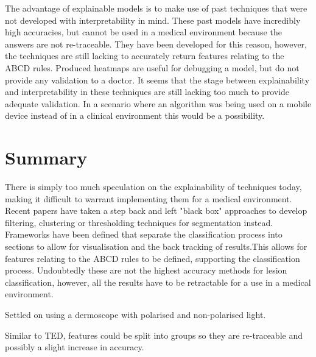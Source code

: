 \documentclass[12pt]{report}
\begin{document}
The advantage of explainable models is to make use of past techniques that were not developed with interpretability in mind. These past models have incredibly high accuracies, but cannot be used in a medical environment because the answers are not re-traceable. They have been developed for this reason, however, the techniques are still lacking to accurately return features relating to the ABCD rules. Produced heatmaps are useful for debugging a model, but do not provide any validation to a doctor. It seems that the stage between explainability and interpretability in these techniques are still lacking too much to provide adequate validation. In a scenario where an algorithm was being used on a mobile device instead of in a clinical environment this would be a possibility.

\section{Summary}
There is simply too much speculation on the explainability of techniques today, making it difficult to warrant implementing them for a medical environment. Recent papers have taken a step back and left "black box" approaches to develop filtering, clustering or thresholding techniques for segmentation instead. Frameworks have been defined that separate the classification process into sections to allow for visualisation and the back tracking of results.This allows for features relating to the ABCD rules to be defined, supporting the classification process. Undoubtedly these are not the highest accuracy methods for lesion classification, however, all the results have to be retractable for a use in a medical environment.

Settled on using a dermoscope with polarised and non-polarised light.

Similar to TED, features could be split into groups so they are re-traceable and possibly a slight increase in accuracy.



\end{document}
